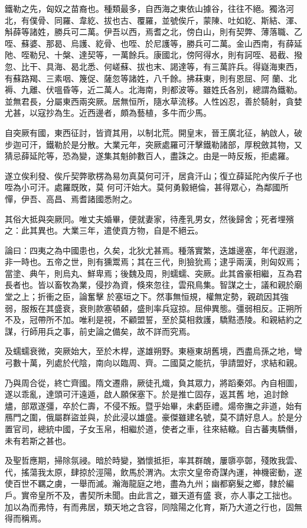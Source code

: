 \begin{pinyinscope}
 鐵勒之先，匈奴之苗裔也。種類最多，自西海之東依山據谷，往往不絕。獨洛河北，有僕骨、同羅、韋紇、拔也古、覆羅，並號俟斤，蒙陳、吐如紇、斯結、渾、斛薛等諸姓，勝兵可二萬。伊吾以西，焉耆之北，傍白山，則有契弊、薄落職、乙咥、蘇婆、那曷、烏護、紇骨、也咥、於尼護等，勝兵可二萬。金山西南，有薛延阤、咥勒兒、十槃、達契等，一萬餘兵。康國北，傍阿得水，則有訶咥、曷截、撥忽、比干、具海、曷北悉、何嵯蘇、拔也末、謁達等，有三萬許兵。得嶷海東西，有蘇路羯、三素咽、篾促、薩忽等諸姓，八千餘。拂菻東，則有恩屈、阿
 蘭、北褥、九離、伏嗢昏等，近二萬人。北海南，則都波等。雖姓氏各別，總謂為鐵勒。並無君長，分屬東西兩突厥。居無恒所，隨水草流移。人性凶忍，善於騎射，貪婪尤甚，以寇抄為生。近西邊者，頗為藝植，多牛而少馬。



 自突厥有國，東西征討，皆資其用，以制北荒。開皇末，晉王廣北征，納啟人，破步迦可汗，鐵勒於是分散。大業元年，突厥處羅可汗擊鐵勒諸部，厚稅斂其物，又猜忌薛延陀等，恐為變，遂集其魁帥數百人，盡誅之。由是一時反叛，拒處羅。



 遂立俟利發、俟斤契弊歌楞為易勿真莫何可汗，居貪汗山；復立薛延陀內俟斤子也咥為小可汗。處羅既敗，莫
 何可汗始大。莫何勇毅絕倫，甚得眾心，為鄰國所憚，伊吾、高昌、焉耆諸國悉附之。



 其俗大抵與突厥同。唯丈夫婚畢，便就妻家，待產乳男女，然後歸舍；死者埋殯之：此其異也。大業三年，遣使貢方物，自是不絕云。



 論曰：四夷之為中國患也，久矣，北狄尤甚焉。種落實繁，迭雄邊塞，年代遐邈，非一時也。五帝之世，則有獯鬻焉；其在三代，則獫狁焉；逮乎兩漢，則匈奴焉；當塗、典午，則烏丸、鮮卑焉；後魏及周，則蠕蠕、突厥。此其酋豪相繼，互為君長者也。皆以畜牧為業，侵抄為資，倏來忽往，雲飛鳥集。智謀之士，議和親於廟堂之上；折衝之臣，論奮擊
 於塞垣之下。然事無恒規，權無定勢，親疏因其強弱，服叛在其盛衰，衰則款塞頓顙，盛則率兵寇掠。屈伸異態。彊弱相反。正朔所不及，冠帶所不加。唯利是視，不顧盟誓，至於莫相救護，驕黠憑陵。和親結約之謀，行師用兵之事，前史論之備矣，故不詳而究焉。



 及蠕蠕衰微，突厥始大，至於木桿，遂雄朔野。東極東胡舊境，西盡烏孫之地，彎弓數十萬，列處於代陰，南向以臨周、齊。二國莫之能抗，爭請盟好，求結和親。



 乃與周合從，終亡齊國。隋文遷鼎，厥徒孔熾，負其眾力，將蹈秦郊。內自相圖，遂以乖亂，達頭可汗遠遁，啟人願保塞下。於是推亡固存，返其舊
 地，追討餘燼，部眾遂彊，卒於仁壽，不侵不叛。暨乎始畢，未虧臣禮。煬帝撫之非道，始有鴈門之圍，俄屬群盜並與，於此浸以雄盛。豪傑雖建名號，莫不請好息人。於是分置官司，總統中國，子女玉帛，相繼於道，使者之車，往來結轍。自古蕃夷驕僭，未有若斯之甚也。



 及聖哲應期，掃除氛祲。暗於時變，猶懷抵拒，率其群醜，屢隳亭鄣，殘敗我雲、代，搖蕩我太原，肆掠於涇陽，飲馬於渭汭。太宗文皇帝奇謀內運，神機密動，遂使百世不羈之虜，一舉而滅。瀚海龍庭之地，盡為九州；幽都窮髮之鄉，隸於編戶。實帝皇所不及，書契所未聞。由此言之，雖天道有盛
 衰，亦人事之工拙也。加以為而弗恃，有而弗居，類天地之含容，同陰陽之化育，斯乃大道之行也，固無得而稱焉。



\end{pinyinscope}